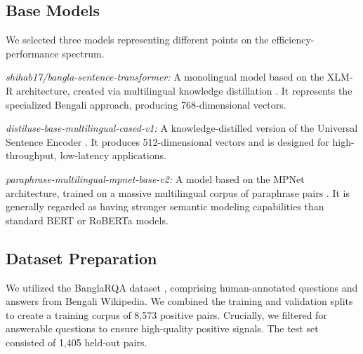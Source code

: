 \documentclass[acmsmall,screen,review]{acmart}
\begin{document}
\subsection{Base Models}
We selected three models representing different points on the efficiency-performance spectrum.

\textit{shihab17/bangla-sentence-transformer:} A monolingual model based on the XLM-R architecture, created via multilingual knowledge distillation \cite{uddin2024bangla}. It represents the specialized Bengali approach, producing 768-dimensional vectors.

\textit{distiluse-base-multilingual-cased-v1:} A knowledge-distilled version of the Universal Sentence Encoder \cite{reimers2019sentencebert}. It produces 512-dimensional vectors and is designed for high-throughput, low-latency applications.

\textit{paraphrase-multilingual-mpnet-base-v2:} A model based on the MPNet architecture, trained on a massive multilingual corpus of paraphrase pairs \cite{reimers2019sentencebert}. It is generally regarded as having stronger semantic modeling capabilities than standard BERT or RoBERTa models.

\subsection{Dataset Preparation}
We utilized the BanglaRQA dataset \cite{ekram2022banglarqa}, comprising human-annotated questions and answers from Bengali Wikipedia. We combined the training and validation splits to create a training corpus of 8,573 positive pairs. Crucially, we filtered for answerable questions to ensure high-quality positive signals. The test set consisted of 1,405 held-out pairs.
\end{document}
